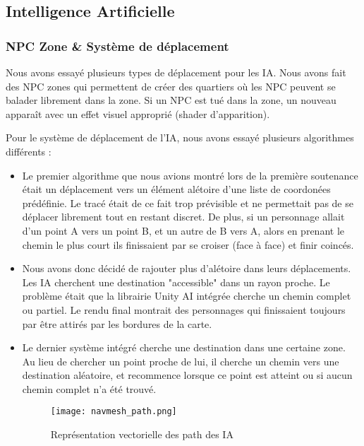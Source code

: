 \subsection{Intelligence Artificielle}
    \subsubsection{NPC Zone \& Système de déplacement}
    Nous avons essayé plusieurs types de déplacement pour les IA. Nous avons fait des NPC zones qui permettent de créer des quartiers
    où les NPC peuvent se balader librement dans la zone. Si un NPC est tué dans la zone, un nouveau apparaît avec un effet visuel 
    approprié (shader d'apparition).
    \newline
    
    Pour le système de déplacement de l'IA,
    nous avons essayé plusieurs algorithmes différents :\newline
    
    \begin{itemize}
        \item Le premier algorithme que nous avions montré lors de la première soutenance
        était un déplacement vers un élément alétoire d'une liste de coordonées prédéfinie.
        Le tracé était de ce fait trop prévisible et ne permettait pas de se déplacer librement tout en restant discret.
        De plus, si un personnage allait d'un point A vers un point B, et un autre de B vers A,
        alors en prenant le chemin le plus court ils finissaient par se croiser (face à face) et finir coincés.
        \newline
        \item  Nous avons donc décidé de rajouter plus d'alétoire dans leurs déplacements.
        Les IA cherchent une destination "accessible" dans un rayon proche.
        Le problème était que la librairie Unity AI intégrée cherche un chemin complet ou partiel.
        Le rendu final montrait des personnages qui finissaient toujours par être attirés par les bordures de la carte.
        \newline

        \item  Le dernier système intégré cherche une destination dans une certaine zone.
        Au lieu de chercher un point proche de lui, il cherche un chemin vers une destination aléatoire, 
        et recommence lorsque ce point est atteint ou si aucun chemin complet n'a été trouvé.
        
        \begin{figure}[hbt!]
            \centering
            \texttt{[image: navmesh\_path.png]}
            \caption{Représentation vectorielle des path des IA}
        \end{figure}
    


    \end{itemize}
    
